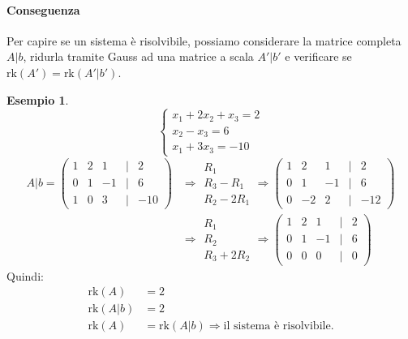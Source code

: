 \documentclass[a4paper]{article}
\theoremstyle{definition}
\newtheorem*{es}{Esempio}
\begin{document}
	\paragraph{Conseguenza} Per capire se un sistema è risolvibile, possiamo considerare la matrice completa $A|b$, ridurla tramite Gauss ad una matrice a scala $A'|b'$ e verificare se $\text{rk}(A') = \text{rk}(A'|b')$.

	\begin{es}
		\begin{equation*}
			\begin{cases}
				x_1 + 2x_2 + x_3 = 2 \\
				x_2 - x_3 = 6 \\
				x_1 + 3x_3 = - 10
			\end{cases}
		\end{equation*}
		\begin{align*}
			A|b = \begin{pmatrix}
				1 & 2 & 1 & \mid & 2 \\
				0 & 1 & -1 & \mid & 6 \\
				1 & 0 & 3 & \mid & -10
			\end{pmatrix}
			&\Rightarrow \begin{matrix}
				R_1 \\
				R_3 - R_1 \\
				R_2 - 2R_1
			\end{matrix} \Rightarrow \begin{pmatrix}
				1 & 2 & 1 & \mid & 2 \\
				0 & 1 & -1 & \mid & 6 \\
				0 & -2 & 2 & \mid & -12
			\end{pmatrix} \\
			&\Rightarrow \begin{matrix}
				R_1 \\
				R_2 \\
				R_3 + 2R_2
			\end{matrix} \Rightarrow \begin{pmatrix}
				1 & 2 & 1 & \mid & 2 \\
				0 & 1 & -1 & \mid & 6 \\
				0 & 0 & 0 & \mid & 0
			\end{pmatrix}
		\end{align*}
		Quindi:
		\begin{align*}
			\text{rk}(A) &= 2 \\
			\text{rk}(A|b) &= 2 \\
			\text{rk}(A) &= \text{rk}(A|b) \Rightarrow \text{il sistema è risolvibile.}
		\end{align*}
	\end{es}
\end{document}
